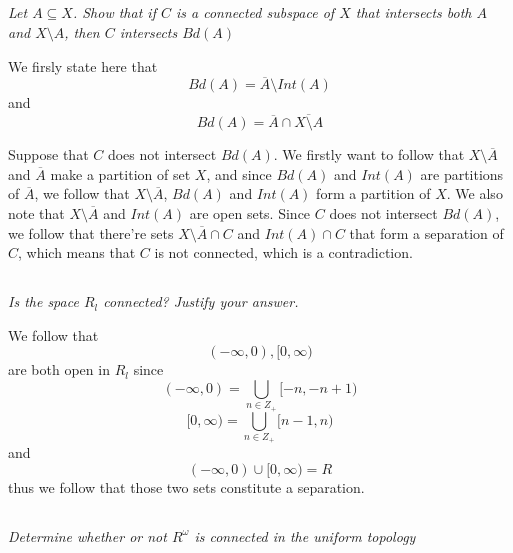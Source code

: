 \documentclass[11pt,oneside,titlepage]{book}
\begin{document}
\subsection{}

\textit{Let $A \subseteq X$. Show that if $C$ is a connected subspace of $X$ that intersects
  both $A$ and $X \setminus A$, then $C$ intersects $Bd(A)$}

We firsly state here that
$$Bd(A) = \overline{A} \setminus Int(A)$$
and
$$Bd(A) = \overline{A} \cap \overline{X \setminus A}$$

Suppose that $C$ does not intersect $Bd(A)$. We firstly want to follow that
$X \setminus \overline A$ and $\overline{A}$ make a partition of set $X$, and since
$Bd(A)$ and $Int(A)$ are partitions of $\overline{A}$, we follow that
$X \setminus \overline A$, $Bd(A)$ and $Int(A)$ form a partition of $X$.
We also note that $X \setminus \overline A$ and $Int(A)$ are open sets. 
Since $C$ does not intersect $Bd(A)$, we follow that there're sets
$X \setminus \overline{A} \cap C$ and $Int(A) \cap C$ that form a separation of $C$, which
means that $C$ is not connected, which is a contradiction.

\subsection{}

\textit{Is the space $R_l$ connected? Justify your answer.}

We follow that
$$(-\infty, 0), [0, \infty)$$
are both open in $R_l$ since
$$(-\infty, 0) = \bigcup_{n \in Z_+}{[-n, -n + 1) }$$
$$[0, \infty) = \bigcup_{n \in Z_+}{[n - 1, n) }$$
and
$$(-\infty, 0) \cup [0, \infty) = R$$
thus we follow that those two sets constitute a separation.

\subsection{}

\textit{Determine whether or not $R^\omega$ is connected in the uniform topology}
\end{document}
